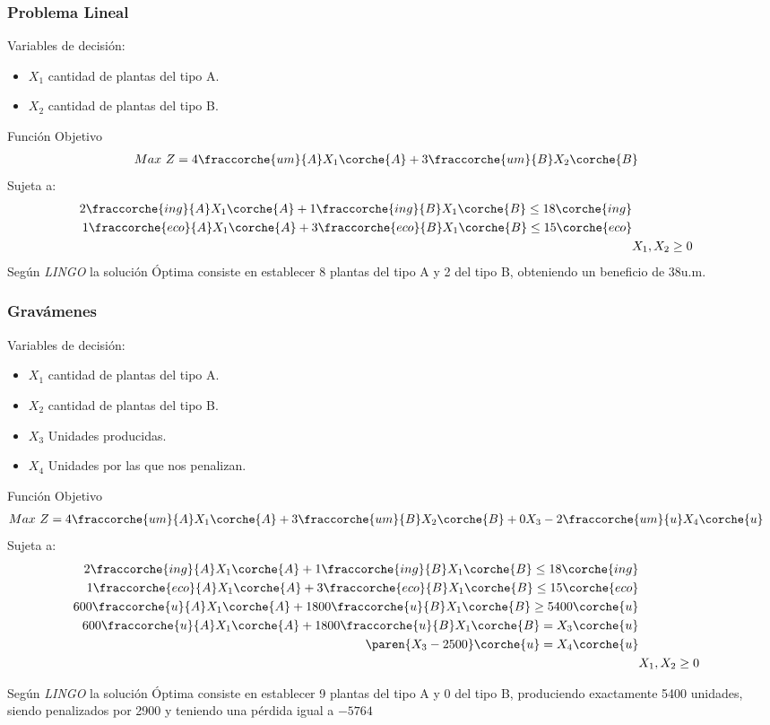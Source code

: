 

\begin{homeworkProblem}[-1][Compañía]
\subsubsection{Problema Lineal}
Variables de decisión:
\begin{itemize}
    \item $X_1$ cantidad de plantas del tipo A.
    \item $X_2$ cantidad de plantas del tipo B.
\end{itemize}
Función Objetivo
\begin{align*}
   Max\ Z = 4\fraccorche{um}{A}&X_1\corche{A} + 3\fraccorche{um}{B}X_2\corche{B} 
\end{align*}
Sujeta a:
\begin{align*}
    2\fraccorche{ing}{A}X_1\corche{A} + 1\fraccorche{ing}{B}X_1\corche{B} \leq 18\corche{ing} \\
    1\fraccorche{eco}{A}X_1\corche{A} + 3\fraccorche{eco}{B}X_1\corche{B} \leq 15\corche{eco} \\
    &X_1,X_2\geq 0
\end{align*}
Según \textit{LINGO} la solución Óptima consiste en establecer 8 plantas del tipo A y 2 del tipo B, obteniendo un beneficio de 38u.m.


\subsubsection{Gravámenes}
Variables de decisión:
\begin{itemize}
    \item $X_1$ cantidad de plantas del tipo A.
    \item $X_2$ cantidad de plantas del tipo B.
    \item $X_3$ Unidades producidas.
    \item $X_4$ Unidades por las que nos penalizan.
\end{itemize}
Función Objetivo
\begin{align*}
   Max\ Z = 4\fraccorche{um}{A}&X_1\corche{A} + 3\fraccorche{um}{B}X_2\corche{B} + 0X_3 - 2\fraccorche{um}{u}X_4\corche{u}
\end{align*}
Sujeta a:
\begin{align*}
    2\fraccorche{ing}{A}X_1\corche{A} + 1\fraccorche{ing}{B}X_1\corche{B} \leq 18\corche{ing} \\
    1\fraccorche{eco}{A}X_1\corche{A} + 3\fraccorche{eco}{B}X_1\corche{B} \leq 15\corche{eco} \\
    600\fraccorche{u}{A}X_1\corche{A} + 1800\fraccorche{u}{B}X_1\corche{B} \geq 5400\corche{u} \\
    600\fraccorche{u}{A}X_1\corche{A} + 1800\fraccorche{u}{B}X_1\corche{B} = X_3\corche{u} \\
    \paren{X_3 - 2500}\corche{u} = X_4\corche{u} \\
    &X_1,X_2\geq 0
\end{align*}

Según \textit{LINGO} la solución Óptima consiste en establecer 9 plantas del tipo A y 0 del tipo B, produciendo exactamente 5400 unidades, siendo penalizados por 2900 y teniendo una pérdida igual a $-5764$

\end{homeworkProblem}


